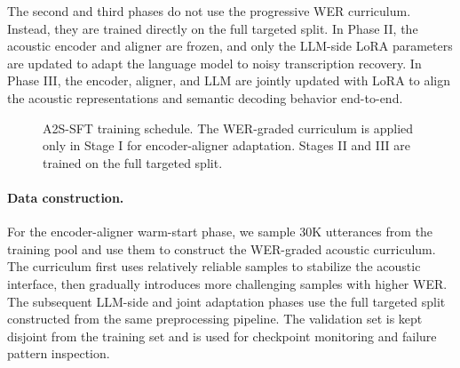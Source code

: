 \documentclass{article}
\begin{document}
The second and third phases do not use the progressive WER curriculum. Instead,
they are trained directly on the full targeted split. In Phase II, the acoustic
encoder and aligner are frozen, and only the LLM-side LoRA parameters are updated
to adapt the language model to noisy transcription recovery. In Phase III, the
encoder, aligner, and LLM are jointly updated with LoRA to align the acoustic
representations and semantic decoding behavior end-to-end.

\begin{figure}[t]
\centering
\setlength{\fboxsep}{7pt}
\vspace{-1mm}
\caption{
A2S-SFT training schedule. The WER-graded curriculum is applied only in Stage I
for encoder-aligner adaptation. Stages II and III are trained on the full
targeted split.
}
\label{fig:a2s_sft_pipeline}
\vspace{-2mm}
\end{figure}

\paragraph{Data construction.}
For the encoder-aligner warm-start phase, we sample $30$K utterances from the
training pool and use them to construct the WER-graded acoustic curriculum. The
curriculum first uses relatively reliable samples to stabilize the acoustic
interface, then gradually introduces more challenging samples with higher WER.
The subsequent LLM-side and joint adaptation phases use the full targeted split
constructed from the same preprocessing pipeline. The validation set is kept
disjoint from the training set and is used for checkpoint monitoring and failure
pattern inspection.
\end{document}
